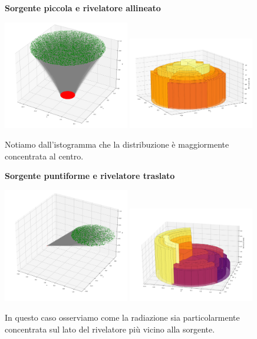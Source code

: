         \begin{figure}[ht]
            \textbf{Sorgente piccola e rivelatore allineato}
            
            \centering
            \includegraphics[width=0.49\textwidth]{images/accettanza/example1.1.png}
            \includegraphics[width=0.49\textwidth]{images/accettanza/example1.2.png}
            \caption{Notiamo dall'istogramma che la distribuzione è maggiormente concentrata al centro.}
        \end{figure}

        \begin{figure}[ht]
            \textbf{Sorgente puntiforme e rivelatore traslato}
            
            \centering
            \includegraphics[width=0.49\textwidth]{images/accettanza/example2.1.png}
            \includegraphics[width=0.49\textwidth]{images/accettanza/example2.2.png}
            \caption{In questo caso osserviamo come la radiazione sia particolarmente concentrata sul lato del rivelatore più vicino alla sorgente.}
        \end{figure}
        
